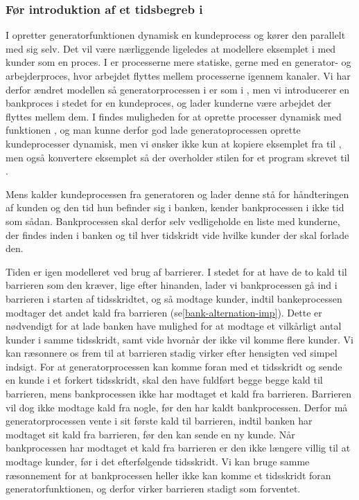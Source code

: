 \subsubsection{Før introduktion af et tidsbegreb i \pycsp}

I \simpy opretter generatorfunktionen dynamisk en kundeprocess og  kører den parallelt med sig selv. Det vil  være nærliggende ligeledes at 
modellere eksemplet i \pycsp med kunder som en proces. I \pycsp er processerne mere statiske, gerne med en generator- og 
arbejderproces, hvor  arbejdet flyttes 
mellem processerne igennem kanaler. Vi har derfor ændret modellen så   
generatorprocessen i \pycsp er som i \simpy, men vi introducerer en bankproces i stedet for en kundeproces, og lader kunderne være arbejdet der flyttes mellem dem. 
I \pycsp findes muligheden for at oprette processer dynamisk med funktionen , og man kunne derfor god lade generatoprocessen oprette kundeprocesser dynamisk, men vi ønsker ikke kun at kopiere eksemplet fra \simpy til \pycsp, men også konvertere eksemplet så der overholder stilen for et program skrevet til \csp. 

Mens \simpy kalder kundeprocessen fra generatoren og lader denne stå for håndteringen af kunden 
og den tid hun befinder sig i banken, kender bankprocessen i \pycsp ikke tid som 
sådan. Bankprocessen skal derfor selv vedligeholde en liste med kunderne, der findes inden i banken og til hver 
tidskridt vide hvilke kunder der skal forlade den. 

Tiden er igen modelleret ved brug af barrierer. I 
stedet for at have de to kald til barrieren som den kræver, lige efter hinanden, lader 
vi bankprocessen gå ind i barrieren i starten af tidsskridtet, og så modtage 
kunder, indtil bankeprocessen modtager det andet kald fra barrieren (se\cref{bank-alternation-imp}). Dette er nødvendigt for at lade banken have 
mulighed for at modtage et vilkårligt antal kunder i samme tidsskridt, samt 
vide hvornår der ikke vil komme flere kunder.  Vi kan ræsonnere os frem til at 
barrieren stadig virker efter hensigten ved  simpel indsigt.
For at generatorprocessen kan komme foran med et tidsskridt og sende en kunde i et forkert tidsskridt,
skal den have fuldført begge begge kald til barrieren, mens bankprocessen ikke 
har modtaget et kald fra barrieren. Barrieren vil dog ikke modtage kald fra 
nogle, før den har  kaldt bankprocessen. Derfor må generatorprocessen vente i 
sit første kald til barrieren, indtil banken har modtaget sit kald fra 
barrieren, før den kan sende en ny kunde.
Når bankprocessen har modtaget et kald fra barrieren er den ikke længere villig 
til at modtage kunder, før i det efterfølgende tidsskridt. Vi kan bruge samme 
ræsonnement for at bankprocessen heller ikke kan komme et 
tidsskridt foran generatorfunktionen, og derfor virker barrieren stadigt som 
forventet. 

